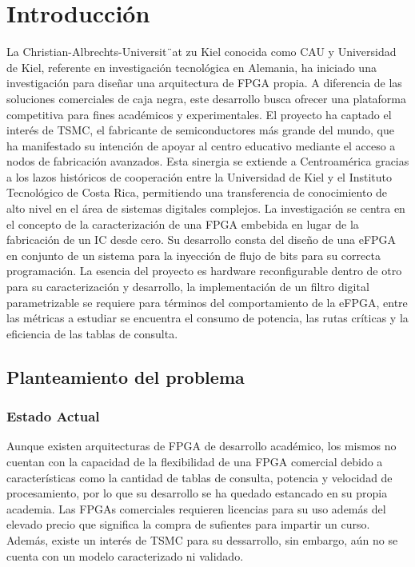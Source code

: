 
\chapter{Introducción}
\label{chp:intro}

La Christian-Albrechts-Universit¨at zu Kiel conocida como CAU y Universidad de Kiel,
referente en investigación tecnológica en Alemania, ha iniciado una investigación para
diseñar una arquitectura de FPGA propia. A diferencia de las soluciones comerciales de
caja negra, este desarrollo busca ofrecer una plataforma competitiva para fines académicos
y experimentales.
El proyecto ha captado el interés de TSMC, el fabricante de semiconductores más grande
del mundo, que ha manifestado su intención de apoyar al centro educativo mediante el
acceso a nodos de fabricación avanzados. Esta sinergia se extiende a Centroamérica gracias
a los lazos históricos de cooperación entre la Universidad de Kiel y el Instituto Tecnológico
de Costa Rica, permitiendo una transferencia de conocimiento de alto nivel en el área de
sistemas digitales complejos.
La investigación se centra en el concepto de la caracterización de una FPGA embebida
en lugar de la fabricación de un IC desde cero. Su desarrollo consta del diseño de una
eFPGA en conjunto de un sistema para la inyección de flujo de bits para su correcta
programación. La esencia del proyecto es hardware reconfigurable dentro de otro para
su caracterización y desarrollo, la implementación de un filtro digital parametrizable se
requiere para términos del comportamiento de la eFPGA, entre las métricas a estudiar
se encuentra el consumo de potencia, las rutas críticas y la eficiencia de las tablas de
consulta.

\section{Planteamiento del problema}

\subsection{Estado Actual}
 Aunque existen arquitecturas de FPGA de desarrollo académico, los mismos no cuentan
con la capacidad de la flexibilidad de una FPGA comercial debido a características como
la cantidad de tablas de consulta, potencia y velocidad de procesamiento, por lo que su 
desarrollo se ha quedado estancado en su propia academia. Las FPGAs comerciales
requieren licencias para su uso además del elevado precio que significa la compra de
sufientes para impartir un curso. Además, existe un interés de TSMC para su dessarrollo,
sin embargo, aún no se cuenta con un modelo caracterizado ni validado.

